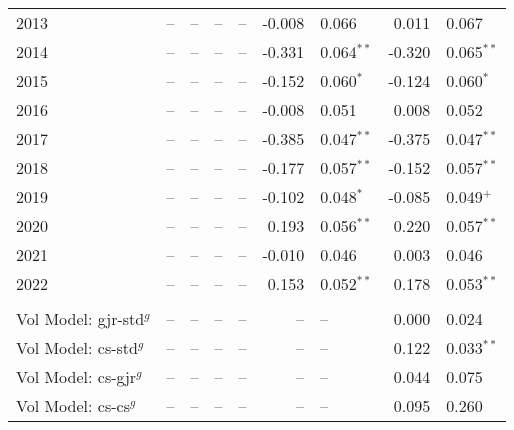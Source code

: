 \documentclass[12pt]{report}
\begin{document}
\begin{table}
\begin{tabular}{l r l r l r l r l}
        2013                               &      -- & --           &      -- & --           &  -0.008 & 0.066        &   0.011 & 0.067         \\
        2014                               &      -- & --           &      -- & --           &  -0.331 & 0.064$^{**}$ &  -0.320 & 0.065$^{**}$  \\
        2015                               &      -- & --           &      -- & --           &  -0.152 & 0.060$^{*}$  &  -0.124 & 0.060$^{*}$   \\
        2016                               &      -- & --           &      -- & --           &  -0.008 & 0.051        &   0.008 & 0.052         \\
        2017                               &      -- & --           &      -- & --           &  -0.385 & 0.047$^{**}$ &  -0.375 & 0.047$^{**}$  \\
        2018                               &      -- & --           &      -- & --           &  -0.177 & 0.057$^{**}$ &  -0.152 & 0.057$^{**}$  \\
        2019                               &      -- & --           &      -- & --           &  -0.102 & 0.048$^{*}$  &  -0.085 & 0.049$^{+}$   \\
        2020                               &      -- & --           &      -- & --           &   0.193 & 0.056$^{**}$ &   0.220 & 0.057$^{**}$  \\
        2021                               &      -- & --           &      -- & --           &  -0.010 & 0.046        &   0.003 & 0.046         \\
        2022                               &      -- & --           &      -- & --           &   0.153 & 0.052$^{**}$ &   0.178 & 0.053$^{**}$  \\  \\
        Vol Model: gjr-std$^{g}$           &      -- & --           &      -- & --           &      -- & --           &   0.000 & 0.024         \\
        Vol Model: cs-std$^{g}$            &      -- & --           &      -- & --           &      -- & --           &   0.122 & 0.033$^{**}$  \\
        Vol Model: cs-gjr$^{g}$            &      -- & --           &      -- & --           &      -- & --           &   0.044 & 0.075         \\
        Vol Model: cs-cs$^{g}$             &      -- & --           &      -- & --           &      -- & --           &   0.095 & 0.260         \\

\end{tabular}
\end{table}
\end{document}
